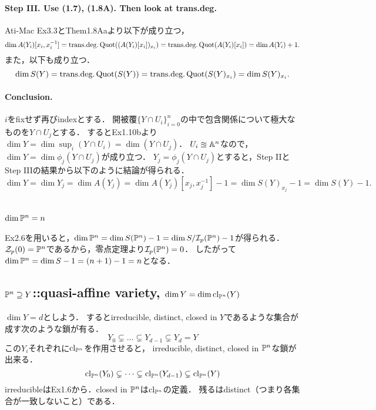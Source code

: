 \documentclass[a4paper]{jsarticle}
\newcommand{\transdeg}{\text{trans.deg.}}
\begin{document}
    \paragraph{Step III. Use (1.7), (1.8A). Then look at trans.deg.}
    Ati-Mac Ex3.3とThem1.8Aaより以下が成り立つ，
    \[ \dim A(Y_i)[x_i, x_i^{-1}]=\transdeg \Quot((A(Y_i)[x_i])_{x_i})=\transdeg \Quot(A(Y_i)[x_i])=\dim A(Y_i)+1. \]
    また，以下も成り立つ．
    \[ \dim S(Y)=\transdeg \Quot(S(Y))=\transdeg \Quot(S(Y)_{x_i})=\dim S(Y)_{x_i}. \]

    \paragraph{Conclusion.}
    $i$をfixせず再びindexとする．
    開被覆$\{Y \cap U_i\}_{i=0}^{n}$の中で包含関係について極大なものを$Y \cap U_j$とする．
    するとEx1.10bより$\dim Y=\dim \sup_i (Y \cap U_i)=\dim (Y \cap U_j)$．
    $U_i \approxeq \mathbb{A}^n$なので，$\dim Y=\dim \phi_j(Y \cap U_j)$が成り立つ．
    $Y_j=\phi_j(Y \cap U_j)$とすると，Step IIとStep IIIの結果から以下のように結論が得られる．
    \[ \dim Y=\dim Y_j=\dim A(Y_j)=\dim A(Y_j)[x_j, x_j^{-1}]-1=\dim S(Y)_{x_j}-1=\dim S(Y)-1. \]

\section{ } %
    \subsection{$\dim \mathbb{P}^n=n$}
    Ex2.6を用いると，$\dim \mathbb{P}^n=\dim S(\mathbb{P}^n)-1=\dim S/\mathcal{I}_p(\mathbb{P}^n)-1$が得られる．
    $\mathcal{Z}_p(0)=\mathbb{P}^n$であるから，零点定理より$\mathcal{I}_p(\mathbb{P}^n)=0$．
    したがって$\dim \mathbb{P}^n=\dim S-1=(n+1)-1=n$となる．

    \subsection{$\mathbb{P}^n \supseteq Y$::quasi-affine variety, $\dim Y=\dim \operatorname{cl}_{\mathbb{P}^n}(Y)$}
    $\dim Y=d$としよう．
    するとirreducible, distinct, closed in $Y$であるような集合が成す次のような鎖が有る．
    \[ Y_0 \subsetneq \dots \subsetneq Y_{d-1} \subsetneq Y_d=Y \]
    この$Y_i$それぞれに$\operatorname{cl}_{\mathbb{P}^n}$を作用させると，
    irreducible, distinct, closed in $\mathbb{P}^n$な鎖が出来る．
    \[ \operatorname{cl}_{\mathbb{P}^n}(Y_0) \subsetneq \dots \subsetneq \operatorname{cl}_{\mathbb{P}^n}(Y_{d-1}) \subsetneq \operatorname{cl}_{\mathbb{P}^n}(Y) \]
    irreducibleはEx1.6から．closed in $\mathbb{P}^n$は$\operatorname{cl}_{\mathbb{P}^n}$の定義．
    残るはdistinct（つまり各集合が一致しないこと）である．
    
\end{document}
